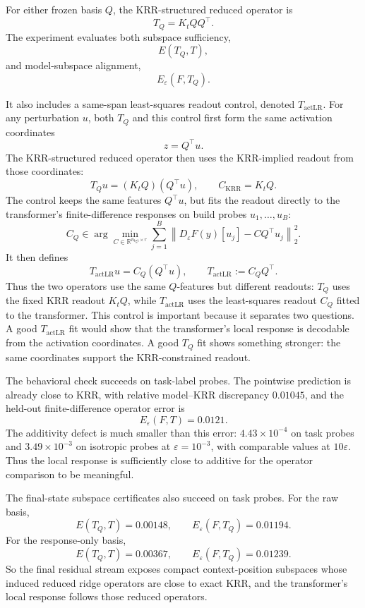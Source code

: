 \documentclass[11pt]{article}
\newcommand{\R}{\mathbb{R}}
\begin{document}
For either frozen basis \(Q\), the KRR-structured reduced operator is
\[
T_Q=K_tQQ^\top.
\]
The experiment evaluates both subspace sufficiency,
\[
E(T_Q,T),
\]
and model-subspace alignment,
\[
E_\varepsilon(F,T_Q).
\]

It also includes a same-span least-squares readout control, denoted \(T_{\mathrm{actLR}}\). For any
perturbation \(u\), both \(T_Q\) and this control first form the same activation coordinates
\[
z=Q^\top u.
\]
The KRR-structured reduced operator then uses the KRR-implied readout from those coordinates:
\[
T_Qu=(K_tQ)(Q^\top u),
\qquad
C_{\mathrm{KRR}}=K_tQ.
\]
The control keeps the same features \(Q^\top u\), but fits the readout directly to the
transformer's finite-difference responses on build probes \(u_1,\ldots,u_B\):
\[
C_Q\in
\arg\min_{C\in\R^{n_{\mathrm{tgt}}\times r}}
\sum_{j=1}^B
\left\|D_\varepsilon F(y)[u_j]-CQ^\top u_j\right\|_2^2.
\]
It then defines
\[
T_{\mathrm{actLR}}u=C_Q(Q^\top u),
\qquad
T_{\mathrm{actLR}}:=C_QQ^\top.
\]
Thus the two operators use the same \(Q\)-features but different readouts: \(T_Q\) uses the fixed KRR
readout \(K_tQ\), while \(T_{\mathrm{actLR}}\) uses the least-squares readout \(C_Q\) fitted to the
transformer. This control is important because it separates two questions. A good
\(T_{\mathrm{actLR}}\) fit would show that the transformer's local response is decodable from the
activation coordinates. A good \(T_Q\) fit shows something stronger: the same coordinates support
the KRR-constrained readout.

The behavioral check succeeds on task-label probes. The pointwise prediction is already close to
KRR, with relative model--KRR discrepancy \(0.01045\), and the held-out finite-difference operator
error is
\[
E_\varepsilon(F,T)=0.0121.
\]
The additivity defect is much smaller than this error: \(4.43\times10^{-4}\) on task probes and
\(3.49\times10^{-3}\) on isotropic probes at \(\varepsilon=10^{-3}\), with comparable values at
\(10\varepsilon\). Thus the local response is sufficiently close to additive for the operator
comparison to be meaningful.

The final-state subspace certificates also succeed on task probes. For the raw basis,
\[
E(T_Q,T)=0.00148,
\qquad
E_\varepsilon(F,T_Q)=0.01194.
\]
For the response-only basis,
\[
E(T_Q,T)=0.00367,
\qquad
E_\varepsilon(F,T_Q)=0.01239.
\]
So the final residual stream exposes compact context-position subspaces whose induced reduced
ridge operators are close to exact KRR, and the transformer's local response follows those reduced
operators.
\end{document}

